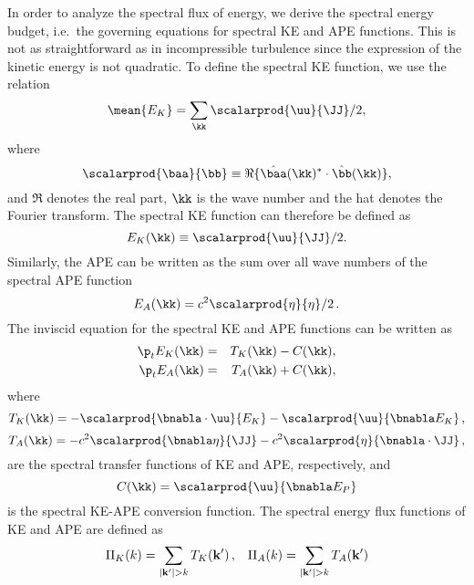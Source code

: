 In order to analyze the spectral flux of energy, we derive the spectral energy
budget, i.e.\ the governing equations for spectral KE and APE
functions. This is not as straightforward as in incompressible turbulence since
the expression of the kinetic energy  is not
quadratic. To define the spectral KE function, we use the relation
\begin{equation}
\mean { E_K } = \sum_\kk \scalarprod{\uu}{\JJ}/2,
\end{equation}
where
\begin{equation}
\scalarprod{\baa}{\bb} \equiv \Re\{ \hat \baa(\kk)^* \cdot \hat \bb(\kk) \},
\end{equation}
and $\Re$ denotes the real part, $\kk$ is the wave number and the
hat denotes the Fourier transform.
%
The spectral KE function can therefore be defined as
\begin{equation}
E_K(\kk) \equiv \scalarprod{\uu}{\JJ}/2.
\end{equation}
Similarly, the APE can be written as the sum over all wave numbers of
the spectral APE function 
\begin{equation}
E_A(\kk) =  c^2 \scalarprod{\eta}{\eta}/2 \, .
\end{equation}
The inviscid equation for the spectral KE and APE functions can be written as
\begin{eqnarray}
\p_t E_K(\kk) &=& T_K(\kk) - C (\kk),\\
\p_t E_A(\kk) &=& T_A(\kk) + C (\kk),
\end{eqnarray}
where
\begin{equation}
T_K(\kk) 
= -\scalarprod{\bnabla \cdot \uu}{E_K} 
-\scalarprod{\uu }{\bnabla E_K } \, ,
\end{equation}
\begin{equation}
T_A(\kk) = -c^2 \scalarprod{\bnabla \eta }{\JJ}- c^2\scalarprod{\eta}{\bnabla \cdot \JJ}  \, ,
\end{equation}
are the spectral transfer functions of KE and APE, respectively, and
\begin{equation}
C (\kk) 
= \scalarprod{\uu}{\bnabla E_P}
\end{equation}
is the spectral KE-APE conversion function.
The spectral energy flux functions of KE and APE are defined as
\begin{eqnarray}
\Pi_K (k) = \sum_{| {\bf k}^{\prime} | > k} T_K ( {\bf k}^\prime ) \, , \;\;\;  \Pi_A (k) = \sum_{| {\bf k}^{\prime} | > k} T_A ( {\bf k}^\prime ) 
\end{eqnarray} 


